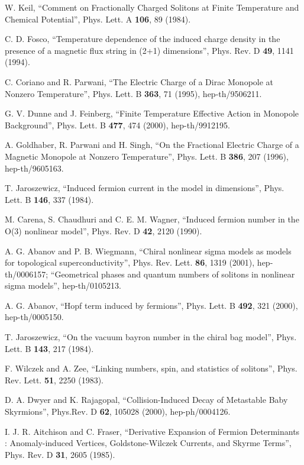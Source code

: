 \documentclass[a4paper,prd]{revtex4}
\begin{document}
\begin{thebibliography}{99}
 W.  Keil,  ``Comment on Fractionally Charged Solitons at
Finite  Temperature and Chemical Potential'',  Phys.  Lett.  A {\bf 106}, 
89 (1984).

 C. D. Fosco, ``Temperature dependence of the
induced charge density in the presence of a magnetic flux string in (2+1)
dimensions'', Phys. Rev. D {\bf 49}, 1141 (1994). 
   

 C.  Coriano and R.  Parwani,  ``The Electric Charge of a Dirac 
Monopole at Nonzero Temperature'',  Phys.  Lett.  B {\bf 363}, 71 (1995),
hep-th/9506211. 

 G. V. Dunne and J.  Feinberg,  ``Finite Temperature Effective 
Action in Monopole Background'',  Phys.  Lett.  B {\bf 477}, 474 (2000),
hep-th/9912195.

 A.  Goldhaber,  R.  Parwani and H.  Singh,  ``On the
Fractional Electric Charge of a Magnetic Monopole at Nonzero Temperature'', 
Phys.  Lett.  B {\bf 386}, 207 (1996), hep-th/9605163.

 T. Jaroszewicz, ``Induced fermion current in the \myHighlight{$\sigma$}\coordHE{} model in
\coordHE{} dimensions'', Phys. Lett. B {\bf 146}, 337 (1984).

 M. Carena, S. Chaudhuri and C. E. M. Wagner, ``Induced fermion
number in the O(3) nonlinear \myHighlight{$\sigma$}\coordHE{} model'', Phys. Rev. D {\bf 42}, 2120
(1990).

 A. G. Abanov and P. B. Wiegmann, ``Chiral nonlinear
sigma models as models for topological superconductivity'', 
Phys. Rev. Lett. {\bf 86}, 1319 (2001), hep-th/0006157;
``Geometrical phases and quantum numbers of solitons in nonlinear 
sigma models'', hep-th/0105213.

 A. G. Abanov, ``Hopf term induced by fermions'',
Phys. Lett. B {\bf 492}, 321 (2000), hep-th/0005150. 

 T. Jaroszewicz, ``On the vacuum bayron number in the chiral bag
model'', Phys. Lett. B {\bf 143}, 217 (1984).

 F. Wilczek and A. Zee, ``Linking numbers, spin, and statistics
of solitons'', Phys. Rev. Lett. {\bf 51}, 2250 (1983).

  D. A. Dwyer and K. Rajagopal, ``Collision-Induced Decay
of Metastable Baby Skyrmions'', Phys.Rev. D {\bf 62}, 105028 (2000),
hep-ph/0004126.
 
  
 I. J. R.  Aitchison and C.  Fraser,  ``Derivative Expansion of
Fermion Determinants : Anomaly-induced Vertices,  Goldstone-Wilczek Currents,  
and Skyrme Terms'',  Phys.  Rev.  D {\bf 31}, 2605 (1985). 


\end{thebibliography}
\end{document}
